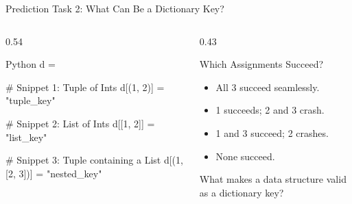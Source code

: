 \begin{frame}[fragile]{Prediction Task 2: What Can Be a Dictionary Key?}
  \begin{columns}[T,onlytextwidth]
    \begin{column}{0.54\textwidth}
      \begin{CodeBlock}{Python}
d = {}

# Snippet 1: Tuple of Ints
d[(1, 2)] = "tuple_key"

# Snippet 2: List of Ints
d[[1, 2]] = "list_key"

# Snippet 3: Tuple containing a List
d[(1, [2, 3])] = "nested_key"
      \end{CodeBlock}
    \end{column}
    \begin{column}{0.43\textwidth}
      \begin{QuestionBox}{Which Assignments Succeed?}
        \begin{itemize}\setlength{\itemsep}{0.12cm}
          \item[\textbf{A)}] All 3 succeed seamlessly.
          \item[\textbf{B)}] 1 succeeds; 2 and 3 crash.
          \item[\textbf{C)}] 1 and 3 succeed; 2 crashes.
          \item[\textbf{D)}] None succeed.
        \end{itemize}
      \end{QuestionBox}
      \vspace{0.10cm}
      {\scriptsize\color{UpGradSlate}What makes a data structure valid as a dictionary key?}
    \end{column}
  \end{columns}
\end{frame}

